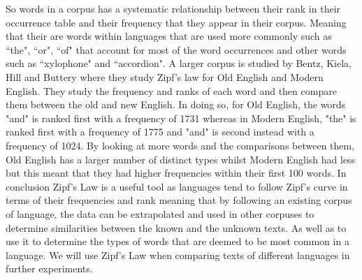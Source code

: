 So words in a corpus has a systematic relationship between their rank in their occurrence table and their frequency that they appear in their corpus. Meaning that their are words within languages that are used more commonly such as ``the", ``or", ``of" that account for most of the word occurrences and other words such as ``xylophone" and ``accordion". A larger corpus is studied by Bentz, Kiela, Hill and Buttery \cite{BentzKielaHillButtery} where they study Zipf's law for Old English and Modern English. They study the frequency and ranks of each word and then compare them between the old and new English. In doing so, for Old English, the words "and" is ranked first with a frequency of 1731 whereas in Modern English, "the" is ranked first with a frequency of 1775 and "and" is second instead with a frequency of 1024. By looking at more words and the comparisons between them, Old English has a larger number of distinct types whilst Modern English had less but this meant that they had higher frequencies within their first 100 words.
In conclusion Zipf's Law is a useful tool as languages tend to follow Zipf's curve in terms of their frequencies and rank meaning that by following an existing corpus of language, the data can be extrapolated and used in other corpuses to determine similarities between the known and the unknown texts. As well as to use it to determine the types of words that are deemed to be most common in a language. We will use Zipf's Law when comparing texts of different languages in further experiments. 